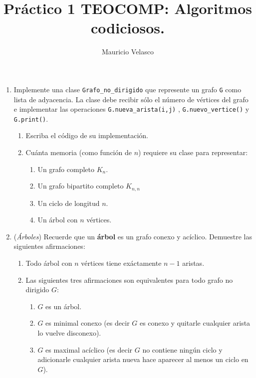 \documentclass[12pt, a4paper]{article}
\date{}
\begin{document}
\title{Pr\'actico 1 TEOCOMP: Algoritmos codiciosos.}
\author{Mauricio Velasco}
\maketitle{}
\begin{enumerate} 
\item Implemente una clase \verb!Grafo_no_dirigido! que represente un grafo \verb!G! como lista de adyacencia. La clase debe recibir sólo el número de vértices del grafo e implementar las operaciones \verb!G.nueva_arista(i,j)! , \verb!G.nuevo_vertice()! y \verb!G.print()!.
\begin{enumerate}
\item Escriba el c\'odigo de su implementaci\'on.
\item Cu\'anta memoria (como funci\'on de $n$) requiere su clase para representar:
\begin{enumerate}
\item Un grafo completo $K_n$.
\item Un grafo bipartito completo $K_{n,n}$
\item Un ciclo de longitud $n$.
\item Un \'arbol con $n$ v\'ertices.
\end{enumerate} 
\end{enumerate}

\item({\it Árboles}) Recuerde que un {\bf árbol} es un grafo conexo y acíclico. Demuestre las siguientes afirmaciones:

\begin{enumerate}
\item Todo árbol con $n$ vértices tiene exáctamente $n-1$ aristas.
\item Las siguientes tres afirmaciones son equivalentes para todo grafo no dirigido $G$:
\begin{enumerate}
\item $G$ es un árbol.
\item $G$ es minimal conexo (es decir $G$ es conexo y quitarle cualquier arista lo vuelve disconexo).
\item $G$ es maximal acíclico (es decir $G$ no contiene ningún ciclo y adicionarle cualquier arista nueva hace aparecer al menos un ciclo en $G$).
\end{enumerate}
\end{enumerate} 



\end{enumerate}
\end{document}
